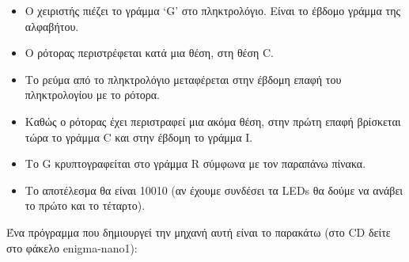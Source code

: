 \documentclass[a4paper,twoside,12pt]{article}
\begin{document}
\begin{itemize}
\item Ο χειριστής πιέζει το γράμμα `G' στο πληκτρολόγιο. Είναι το έβδομο γράμμα της αλφαβήτου.
\item O ρότορας περιστρέφεται κατά μια θέση, στη θέση C.
\item Το ρεύμα από το πληκτρολόγιο μεταφέρεται στην έβδομη επαφή του πληκτρολογίου με το ρότορα.
\item Καθώς ο ρότορας έχει περιστραφεί μια ακόμα θέση, στην πρώτη επαφή βρίσκεται τώρα το γράμμα C και στην έβδομη το γράμμα I.
\item Το G κρυπτογραφείται στο γράμμα R σύμφωνα με τον παραπάνω πίνακα.
\item Το αποτέλεσμα θα είναι 10010  (αν έχουμε συνδέσει τα LEDs θα δούμε να ανάβει το πρώτο και το τέταρτο).
\end{itemize}

Ένα πρόγραμμα που δημιουργεί την μηχανή αυτή είναι το παρακάτω (στο CD δείτε στο φάκελο enigma-nano1):
\end{document}

